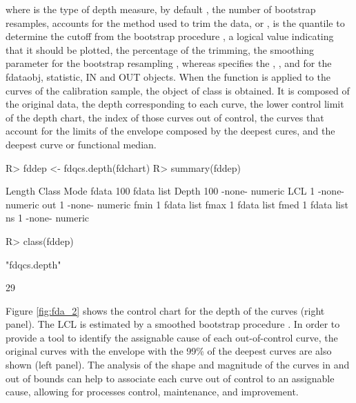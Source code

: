 \noindent where  is the type of depth measure, by default ,  the number of bootstrap resamples,  accounts for the method used to trim the data,  or  \citep{flores2020constructing},  is the quantile to determine the cutoff from the bootstrap procedure \citep{flores2020constructing},  a logical value indicating that it should be plotted,  the percentage of the trimming,  the smoothing parameter for the bootstrap resampling \citep{flores2020constructing}, whereas  specifies the , , and  for the fdataobj, statistic, IN and OUT objects. When the  function is applied to the curves of the calibration sample, the  object of  class is obtained. It is composed of the original data, the depth corresponding to each curve, the lower control limit of the depth chart, the index of those curves out of control, the curves that account for the limits of the envelope composed by the deepest cures, and the deepest curve or functional median.


\begin{example}
R> fddep <- fdqcs.depth(fdchart)
R> summary(fddep)
\end{example}
\begin{example}
      Length Class  Mode   
fdata 100    fdata  list   
Depth 100    -none- numeric
LCL     1    -none- numeric
out     1    -none- numeric
fmin    1    fdata  list   
fmax    1    fdata  list   
fmed    1    fdata  list   
ns      1    -none- numeric
\end{example}
\begin{example}
R> class(fddep)
\end{example}
\begin{example}
[1] "fdqcs.depth"
\end{example}
\begin{example}
[1] 29
\end{example}


Figure \ref{fig:fda_2} shows the control chart for the depth of the curves (right panel). The LCL is estimated by a smoothed bootstrap procedure \citep{flores2020constructing}. In order to provide a tool to identify the assignable cause of each out-of-control curve, the original curves with the envelope with the 99\% of the deepest curves are also shown (left panel). The analysis of the shape and magnitude of the curves in and out of bounds  can help to associate each curve out of control to an assignable cause, allowing for processes control, maintenance, and improvement.

